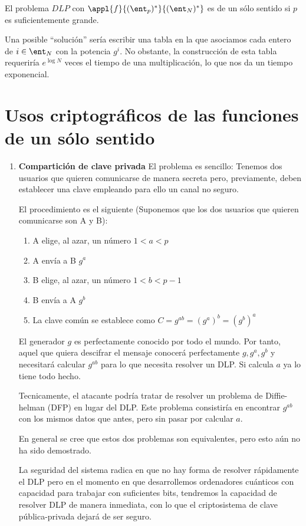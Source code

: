 \begin{corol}
El problema $DLP$ con $\appl{f}{(\ent_p)^*}{(\ent_N)^*}$ es de un sólo sentido si $p$ es suficientemente grande.
\end{corol}

Una posible ``solución'' sería escribir una tabla en la que asociamos cada entero de $i \in\ent_N$ con la potencia $g^i$. No obstante, la construcción de esta tabla requeriría $e^{\log N}$ veces el tiempo de una multiplicación, lo que nos da un tiempo exponencial.


\section{Usos criptográficos de las funciones de un sólo sentido}
\begin{enumerate}
\item \textbf{Compartición de clave privada}
El problema es sencillo: Tenemos dos usuarios que quieren comunicarse de manera secreta pero, previamente, deben establecer una clave empleando para ello un canal no seguro.

El procedimiento es el siguiente (Suponemos que los dos usuarios que quieren comunicarse son A y B):
\begin{enumerate}
\item A elige, al azar, un número $1<a<p$
\item A envía a B $g^a$
\item B elige, al azar, un número $1<b<p-1$
\item B envía a A $g^b$

\item La clave común se establece como $C=g^{ab}=(g^a)^b = (g^b)^a$
\end{enumerate}

El generador $g$ es perfectamente conocido por todo el mundo. Por tanto, aquel que quiera descifrar el mensaje conocerá perfectamente $g,g^a,g^b$ y necesitará calcular $g^{ab}$ para lo que necesita resolver un DLP. Si calcula $a$ ya lo tiene todo hecho.

Tecnicamente, el atacante podría tratar de resolver un problema de Diffie-helman (DFP) en lugar del DLP. Este problema consistiría en encontrar $g^{ab}$ con los mismos datos que antes, pero sin pasar por calcular $a$.

En general se cree que estos dos problemas son equivalentes, pero esto aún no ha sido demostrado.

La seguridad del sistema radica en que no hay forma de resolver rápidamente el DLP pero en el momento en que desarrollemos ordenadores cuánticos con capacidad para trabajar con suficientes bits, tendremos la capacidad de resolver DLP de manera inmediata, con lo que el criptosistema de clave pública-privada dejará de ser seguro.


\end{enumerate}
